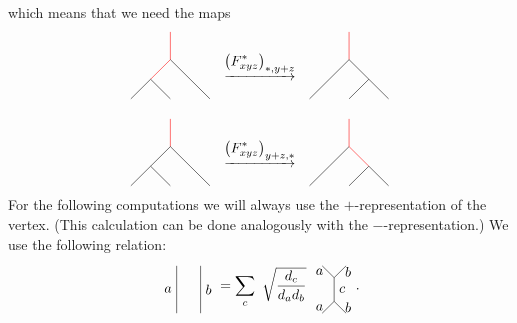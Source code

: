 which means that we need the maps
	\begin{align*}
		\begin{tikzpicture}[scale=0.7,baseline=(current bounding box.center)]
			\draw[red] (0,0) -- (0,1);
			\draw[red] (0,0) -- (-0.707107,-0.707107);
			\draw (-0.707107,-0.707107) -- (-1.41421,-1.41421);
			\draw (-0.707107,-0.707107) -- (0,-1.41421);
			\draw (0,0) -- (0.707107,-0.707107);
			\draw (0.707107,-0.707107) -- (1.41421,-1.41421);
		\end{tikzpicture}\hspace{10pt}
		&\underrightarrow{\left(F_{xyz}^*\right)_{*,y+z}}\hspace{10pt}
		\begin{tikzpicture}[scale=0.7,baseline=(current bounding box.center)]
			\draw[red] (0,0) -- (0,1);
			\draw (0,0) -- (-0.707107,-0.707107);
			\draw (-0.707107,-0.707107) -- (-1.41421,-1.41421);
			\draw (0.707107,-0.707107) -- (0,-1.41421);
			\draw (0,0) -- (0.707107,-0.707107);
			\draw (0.707107,-0.707107) -- (1.41421,-1.41421);
		\end{tikzpicture}\\[10pt]
		\begin{tikzpicture}[scale=0.7,baseline=(current bounding box.center)]
			\draw[red] (0,0) -- (0,1);
			\draw (0,0) -- (-0.707107,-0.707107);
			\draw (-0.707107,-0.707107) -- (-1.41421,-1.41421);
			\draw (-0.707107,-0.707107) -- (0,-1.41421);
			\draw (0,0) -- (0.707107,-0.707107);
			\draw (0.707107,-0.707107) -- (1.41421,-1.41421);
		\end{tikzpicture}\hspace{10pt}
		&\underrightarrow{\left(F_{xyz}^*\right)_{y+z,*}}\hspace{10pt}
		\begin{tikzpicture}[scale=0.7,baseline=(current bounding box.center)]
			\draw[red] (0,0) -- (0,1);
			\draw (0,0) -- (-0.707107,-0.707107);
			\draw (-0.707107,-0.707107) -- (-1.41421,-1.41421);
			\draw (0.707107,-0.707107) -- (0,-1.41421);
			\draw[red] (0,0) -- (0.707107,-0.707107);
			\draw (0.707107,-0.707107) -- (1.41421,-1.41421);
		\end{tikzpicture}
	\end{align*}
For the following computations we will always use the $+$-representation of the vertex. (This calculation can be done analogously with the $-$-representation.) We use the following relation:
	\begin{equation}
		\begin{tikzpicture}[scale=1.2,baseline=(current bounding box.center)]
			\draw (0,0) to node [left] {$a$} (0,1);
			\draw (0.5,0) to node [right] {$b$} (0.5,1);
		\end{tikzpicture}=\sum_c\ \sqrt{\frac{d_c}{d_a d_b}}\ 
		\begin{tikzpicture}[scale=1.2,baseline=(current bounding box.center)]
			\draw (0,0) to node [left] {$a$} (0.25,0.25);
			\draw (0.5,0) to node [right] {$b$} (0.25,0.25);
			\draw (0,1) to node [left] {$a$} (0.25,0.75);
			\draw (0.5,1) to node [right] {$b$} (0.25,0.75);
			\draw (0.25,0.25) to node [right] {$c$} (0.25,0.75);
		\end{tikzpicture}.
	\end{equation}
